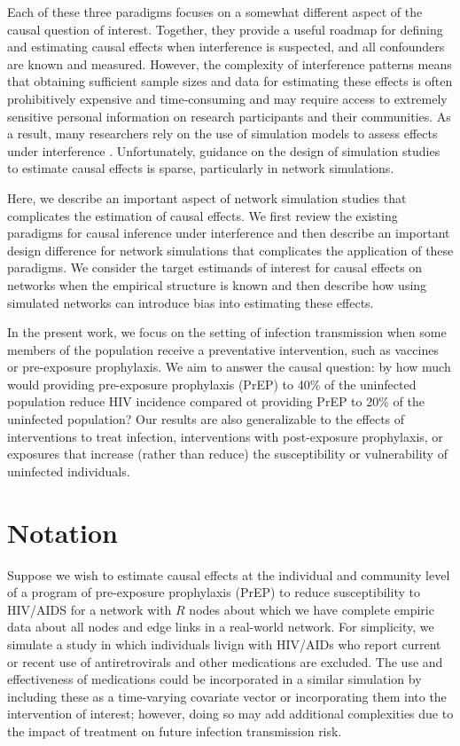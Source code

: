 \documentclass{article}
\theoremstyle{definition}
\begin{document}
Each of these three paradigms focuses on a somewhat different aspect of the causal question of interest. Together, they provide a useful roadmap for defining and estimating causal effects when interference is suspected, and all confounders are known and measured. However, the complexity of interference patterns means that obtaining sufficient sample sizes and data for estimating these effects is often prohibitively expensive and time-consuming and may require access to extremely sensitive personal information on research participants and their communities. As a result, many researchers rely on the use of simulation models to assess effects under interference \cite{murray_emulating_2021, buchanan_disseminated_2021,forastiere_identification_2021,buchanan_methods_2023}. Unfortunately, guidance on the design of simulation studies to estimate causal effects is sparse, particularly in network simulations.


Here, we describe an important aspect of network simulation studies that complicates the estimation of causal effects. We first review the existing paradigms for causal inference under interference and then describe an important design difference for network simulations that complicates the application of these paradigms. We consider the target estimands of interest for causal effects on networks when the empirical structure is known and then describe how using simulated networks can introduce bias into estimating these effects. 

In the present work, we focus on the setting of infection transmission when some members of the population receive a preventative intervention, such as vaccines or pre-exposure prophylaxis. We aim to answer the causal question: by how much would providing pre-exposure prophylaxis (PrEP) to 40\% of the uninfected population reduce HIV incidence compared ot providing PrEP to 20\% of the uninfected population? Our results are also generalizable to the effects of interventions to treat infection, interventions with post-exposure prophylaxis, or exposures that increase (rather than reduce) the susceptibility or vulnerability of uninfected individuals. 

\section{Notation}
Suppose we wish to estimate causal effects at the individual and community level of a program of pre-exposure prophylaxis (PrEP) to reduce susceptibility to HIV/AIDS for a network with $R$ nodes about which we have complete empiric data about all nodes and edge links in a real-world network. For simplicity, we simulate a study in which individuals livign with HIV/AIDs who report current or recent use of antiretrovirals and other medications are excluded. The use and effectiveness of medications could be incorporated in a similar simulation by including these as a time-varying covariate vector or incorporating them into the intervention of interest; however, doing so may add additional complexities due to the impact of treatment on future infection transmission risk.
\end{document}
